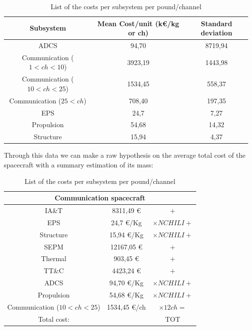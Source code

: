 \documentclass[11pt,a4paper,titlepage]{article}
\begin{document}
		\begin{table}
			\centering
			\begin{tabular}{ccc}
			\toprule
			Subsystem & Mean Cost/unit (k\euro/kg or ch) & Standard deviation\\
			\midrule
			ADCS                                         & 94,70     & 8719,94\\
			Communication ($1 < ch < 10$)   & 3923,19 & 1443,98\\
			Communication ($10 < ch < 25$) & 1534,45 & 558,37\\
			Communication ($25 < ch$)         & 708,40   & 197,35\\
			EPS                                            & 24,7      & 7,27\\
			Propulsion                                  & 54,68     & 14,32\\
			Structure                                    & 15,94     & 4,37\\
			\bottomrule
			\end{tabular}
			\caption{List of the costs per subsystem per pound/channel}
			\label{tab:systems2}
		\end{table}
		
		Through this data we can make a raw hypothesis on the average total cost of the spacecraft with a summary estimation 			of its mass:
		
		\begin{table}
			\centering
			\begin{tabular}{ccc}
			\toprule
			\multicolumn{3}{c}{Communication spacecraft}\\
			\midrule
			IA\&T       & 8311,49 \euro       & $+$\\
			EPS          & 24,7 \euro/Kg        & $\times NCHILI +$\\
			Structure   & 15,94  \euro/Kg     & $\times NCHILI +$\\
			SEPM        & 12167,05 \euro     & $+$\\
			Thermal    & 903,45 \euro        & $+$\\
			TT\&C       & 4423,24 \euro      & $+$\\ 
			ADCS        & 94,70 \euro/Kg     & $\times NCHILI +$\\
			Propulsion & 54,68   \euro/Kg   & $\times NCHILI +$\\
			Communication ($10 < ch < 25$) & 1534,45 \euro/ch & $\times 12 ch =$\\
			\bottomrule
			Total cost:& & TOT\\
			\end{tabular}
			\caption{List of the costs per subsystem per pound/channel}
			\label{tab:cost}
		\end{table}
\end{document}
